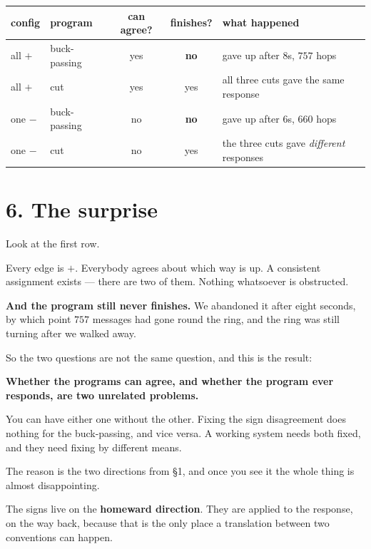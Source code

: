 \documentclass[11pt,a4paper]{article}
\begin{document}
\begin{center}
\small
\setlength{\tabcolsep}{4pt}
\begin{tabular}{llccl}
\toprule
config & program & can agree? & finishes? & what happened \\
\midrule
all $+$   & buck-passing & yes & \textcolor{bad}{\textbf{no}}  & gave up after 8s, $757$ hops \\
all $+$   & cut          & yes & \textcolor{good}{yes} & all three cuts gave the same response \\
one $-$   & buck-passing & no  & \textcolor{bad}{\textbf{no}}  & gave up after 6s, $660$ hops \\
one $-$   & cut          & no  & \textcolor{good}{yes} & the three cuts gave \emph{different} responses \\
\bottomrule
\end{tabular}
\end{center}

\section*{6. The surprise}

Look at the first row.

Every edge is $+$. Everybody agrees about which way is up. A consistent
assignment exists --- there are two of them. Nothing whatsoever is obstructed.

\textbf{And the program still never finishes.} We abandoned it after eight
seconds, by which point $757$ messages had gone round the ring, and the ring was
still turning after we walked away.

So the two questions are not the same question, and this is the result:

\begin{keybox}
\textbf{Whether the programs can agree, and whether the program ever responds,
are two unrelated problems.}

You can have either one without the other. Fixing the sign disagreement does
nothing for the buck-passing, and vice versa. A working system needs both
fixed, and they need fixing by different means.
\end{keybox}

The reason is the two directions from \S1, and once you see it the whole thing is
almost disappointing.

The signs live on the \textbf{homeward direction}. They are applied to the response,
on the way back, because that is the only place a translation between two
conventions can happen.
\end{document}
